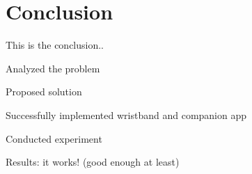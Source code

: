 \chapter{Conclusion}

This is the conclusion..


Analyzed the problem

Proposed solution

Successfully implemented wristband and companion app

Conducted experiment

Results: it works! (good enough at least)